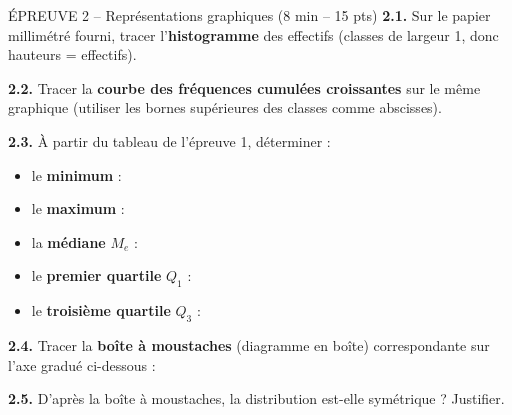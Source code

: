 \documentclass[11pt,a4paper]{article}
\begin{document}
\begin{epreuve}{ÉPREUVE 2 -- Représentations graphiques \hfill \small (8 min -- 15 pts)}
\textbf{2.1.} Sur le papier millimétré fourni, tracer l'\textbf{histogramme} des effectifs (classes de largeur 1, donc hauteurs = effectifs).

\vspace{0.2cm}
\textbf{2.2.} Tracer la \textbf{courbe des fréquences cumulées croissantes} sur le même graphique (utiliser les bornes supérieures des classes comme abscisses).

\vspace{0.2cm}
\textbf{2.3.} À partir du tableau de l'épreuve 1, déterminer :
\begin{itemize}[leftmargin=*,itemsep=1pt]
  \item le \textbf{minimum} : \dotfill
  \item le \textbf{maximum} : \dotfill
  \item la \textbf{médiane} $M_e$ : \dotfill
  \item le \textbf{premier quartile} $Q_1$ : \dotfill
  \item le \textbf{troisième quartile} $Q_3$ : \dotfill
\end{itemize}

\vspace{0.2cm}
\textbf{2.4.} Tracer la \textbf{boîte à moustaches} (diagramme en boîte) correspondante sur l'axe gradué ci-dessous :

\vspace{0.4cm}
\begin{center}
\end{center}

\vspace{0.2cm}
\textbf{2.5.} D'après la boîte à moustaches, la distribution est-elle symétrique ? Justifier.
\end{epreuve}

\newpage
\end{document}
